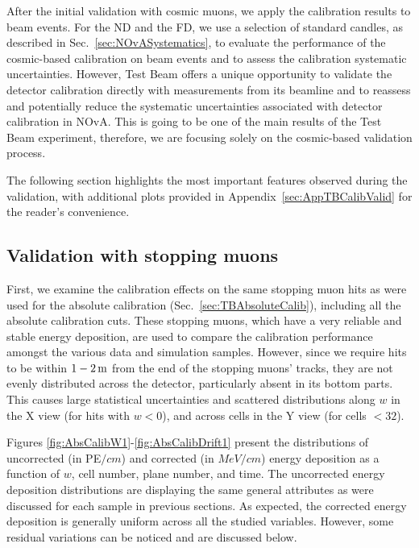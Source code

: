 After the initial validation with cosmic muons, we apply the calibration results to beam events. For the \gls{ND} and the \gls{FD}, we use a selection of standard candles, as described in Sec.~\ref{sec:NOvASystematics}, to evaluate the performance of the cosmic-based calibration on beam events and to assess the calibration systematic uncertainties. However, Test Beam offers a unique opportunity to validate the detector calibration directly with measurements from its beamline and to reassess and potentially reduce the systematic uncertainties associated with detector calibration in \gls{NOvA}. This is going to be one of the main results of the Test Beam experiment, therefore, we are focusing solely on the cosmic-based validation process.

The following section highlights the most important features observed during the validation, with additional plots provided in Appendix~\ref{sec:AppTBCalibValid} for the reader's convenience.

\subsection{Validation with stopping muons}

First, we examine the calibration effects on the same stopping muon hits as were used for the absolute calibration (Sec.~\ref{sec:TBAbsoluteCalib}), including all the absolute calibration cuts. These stopping muons, which have a very reliable and stable energy deposition, are used to compare the calibration performance amongst the various data and simulation samples. However, since we require hits to be within $\unit[1-2]{m}$ from the end of the stopping muons' tracks, they are not evenly distributed across the detector, particularly absent in its bottom parts. This causes large statistical uncertainties and scattered distributions along $w$ in the X view (for hits with $w<0$), and across cells in the Y view (for cells $<32$).

Figures \ref{fig:AbsCalibW1}-\ref{fig:AbsCalibDrift1} present the distributions of uncorrected (in \gls{PE}$\unit{/cm}$) and corrected (in $\unit{MeV/cm}$) energy deposition as a function of $w$, cell number, plane number, and time. The uncorrected energy deposition distributions are displaying the same general attributes as were discussed for each sample in previous sections. As expected, the corrected energy deposition is generally uniform across all the studied variables. However, some residual variations can be noticed and are discussed below.

